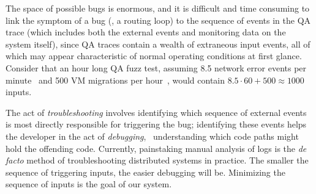 The space of possible bugs is enormous, and it is difficult and time
consuming to link the
symptom of a bug (\eg, a routing loop) to the sequence of events in the QA
trace (which includes both the external events and monitoring data on the
system itself), since QA traces contain a wealth
of extraneous input events, all of which may appear characteristic of normal
operating conditions at first glance. Consider that an hour long QA fuzz test, assuming 8.5 network error events per
minute~\cite{Greenberg:2009:VSF:1592568.1592576} and 500 VM migrations per
hour~\cite{Soundararajan:2010:CBS:1899928.1899941},
would contain $8.5 \cdot 60 + 500 \approx 1000$ inputs.

The act of {\em troubleshooting} involves identifying which sequence of
external events is most directly responsible for triggering the bug;
identifying these events helps the developer in the act of {\em debugging},
\ie~understanding which code paths might
hold the offending code. Currently, painstaking manual analysis of logs is the {\em de facto} method of troubleshooting distributed systems in practice.
The smaller the sequence of triggering inputs, the easier debugging will
be. Minimizing the sequence of inputs is the goal of our system.

